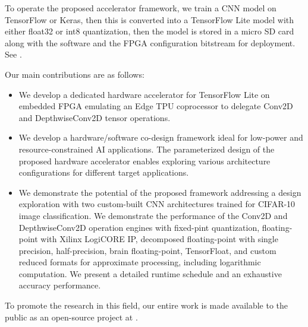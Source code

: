 To operate the proposed accelerator framework, we train a CNN model on TensorFlow or Keras, then this is converted into a TensorFlow Lite model with either float32 or int8 quantization, then the model is stored in a micro SD card along with the software and the FPGA configuration bitstream for deployment. See .

Our main contributions are as follows:
\begin{itemize}
	\item We develop a dedicated hardware accelerator for TensorFlow Lite on embedded FPGA emulating an Edge TPU coprocessor to delegate Conv2D and DepthwiseConv2D tensor operations.
	\item We develop a hardware/software co-design framework ideal for low-power and resource-constrained AI applications. The parameterized design of the proposed hardware accelerator enables exploring various architecture configurations for different target applications.
	\item We demonstrate the potential of the proposed framework addressing a design exploration with two custom-built CNN architectures trained for CIFAR-10 image classification. We demonstrate the performance of the Conv2D and DepthwiseConv2D operation engines with fixed-pint quantization, floating-point with Xilinx LogiCORE IP, decomposed floating-point with single precision, half-precision, brain floating-point, TensorFloat, and custom reduced formats for approximate processing, including logarithmic computation. We present a detailed runtime schedule and an exhaustive accuracy performance.
\end{itemize}

To promote the research in this field, our entire work is made available to the public as an open-source project at .